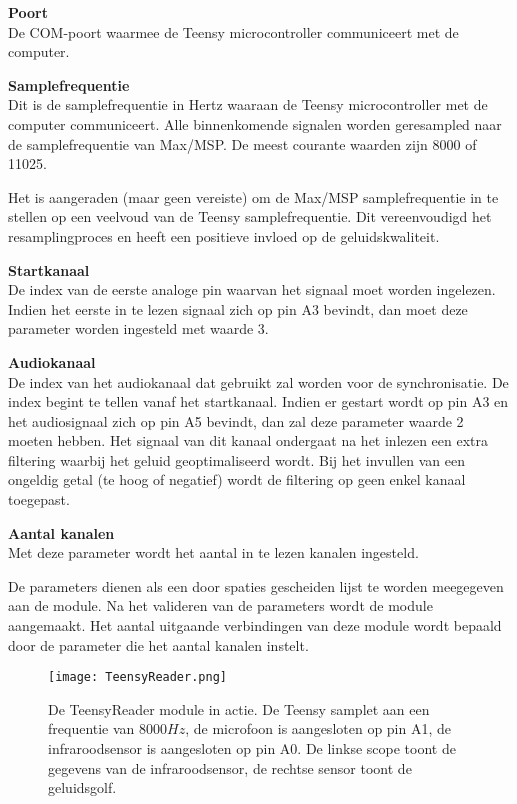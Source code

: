 \begin{description}	
	\item\textbf{Poort} \hfill \\
	De COM-poort waarmee de Teensy microcontroller communiceert met de computer.
	\item\textbf{Samplefrequentie} \hfill \\
	Dit is de samplefrequentie in Hertz waaraan de Teensy microcontroller met de computer communiceert. Alle binnenkomende signalen worden geresampled naar de samplefrequentie van Max/MSP. De meest courante waarden zijn 8000 of 11025. 
	
	Het is aangeraden (maar geen vereiste) om de Max/MSP samplefrequentie in te stellen op een veelvoud van de Teensy samplefrequentie. Dit vereenvoudigd het resamplingproces en heeft een positieve invloed op de geluidskwaliteit.
	
	\item\textbf{Startkanaal} \hfill \\
	De index van de eerste analoge pin waarvan het signaal moet worden ingelezen. Indien het eerste in te lezen signaal zich op pin A3 bevindt, dan moet deze parameter worden ingesteld met waarde 3.
	
	\item\textbf{Audiokanaal} \hfill \\
	De index van het audiokanaal dat gebruikt zal worden voor de synchronisatie. De index begint te tellen vanaf het startkanaal. Indien er gestart wordt op pin A3 en het audiosignaal zich op pin A5 bevindt, dan zal deze parameter waarde 2 moeten hebben. Het signaal van dit kanaal ondergaat na het inlezen een extra filtering waarbij het geluid geoptimaliseerd wordt. Bij het invullen van een ongeldig getal (te hoog of negatief) wordt de filtering op geen enkel kanaal toegepast.

	\item\textbf{Aantal kanalen} \hfill \\
	Met deze parameter wordt het aantal in te lezen kanalen ingesteld.
\end{description}

De parameters dienen als een door spaties gescheiden lijst te worden meegegeven aan de module. Na het valideren van de parameters wordt de module aangemaakt. Het aantal uitgaande verbindingen van deze module wordt bepaald door de parameter die het aantal kanalen instelt.

\begin{figure}[h!]
	\captionsetup{width=0.8\textwidth}
	\caption[Screenshot van de TeensyReader in Max/MSP]{De TeensyReader module in actie. De Teensy samplet aan een frequentie van $8000 Hz$, de microfoon is aangesloten op pin A1, de infraroodsensor is aangesloten op pin A0. De linkse scope toont de gegevens van de infraroodsensor, de rechtse sensor toont de geluidsgolf.}
	\begin{center}
		\advance\parskip0.3cm
		\texttt{[image: TeensyReader.png]}
	\end{center}
	\label{teensyReader}
\end{figure}

